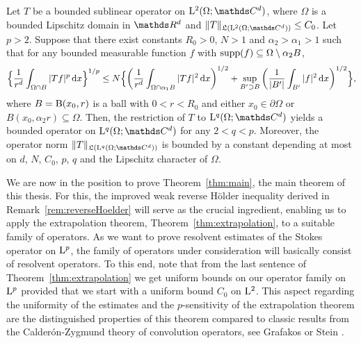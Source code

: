 \begin{thm}
  \label{thm:extrapolation}
  Let $T$ be a bounded sublinear operator on $\Ell^2(\Omega; \C^d)$, where $\Omega$ is a bounded Lipschitz domain in $\R^d$ and $\|T\|_{\Li(\Ell^2(\Omega; \C^d))} \leq C_0$.
  Let $p > 2$.
  Suppose that there exist constants $R_0 > 0$, $N > 1$ and $\alpha_2 > \alpha_1 > 1$ such that for any bounded measurable function $f$ with $\operatorname{supp}(f) \subseteq \Omega \setminus \alpha_2 B$,
  \begin{align*}
    \Big\{ \frac{1}{r^d} \int_{\Omega \cap B} |Tf|^p \, {\operatorname{d}\!{x}} \Big\}^{1/p}
    \leq N \Big\{ \bigg( \frac{1}{r^d} \int_{\Omega \cap \alpha_1 B} |T f|^2 \, {\operatorname{d}\!{x}} \bigg)^{1/2} + \sup_{B' \supset B} \bigg( \frac{1}{|B'|} \int_{B'} |f|^2 \, {\operatorname{d}\!{x}} \bigg)^{1/2} \Big\},
  \end{align*}
  where $B = \mathrm{B}(x_0, r)$ is a ball with $0 < r < R_0$ and either $x_0 \in \partial\Omega$ or $B(x_0, \alpha_2 r) \subseteq \Omega$.
  Then, the restriction of $T$ to $\Ell^q(\Omega;\C^d)$ yields a bounded operator on $\Ell^q(\Omega; \C^d)$ for any $2 < q < p$.
  Moreover, the operator norm $\|T\|_{\Li(\Ell^q(\Omega; \C^d))}$ is bounded by a constant depending at most on $d$, $N$, $C_0$, $p$, $q$ and the Lipschitz character of $\Omega$.
\end{thm}

We are now in the position to prove Theorem~\ref{thm:main}, the main theorem of this thesis. 
For this, the improved weak reverse H\"older inequality derived in Remark~\ref{rem:reverseHoelder} will serve as the crucial ingredient, enabling us to apply the extrapolation theorem, Theorem~\ref{thm:extrapolation}, to a suitable family of operators.
As we want to prove resolvent estimates of the Stokes operator on $\mathrm{L}^p$, the family of operators under consideration will basically consist of resolvent operators.
To this end, note that from the last sentence of Theorem~\ref{thm:extrapolation} we get uniform bounds on our operator family on $\mathrm{L}^p$ provided that we start with a uniform bound $C_0$ on $\mathrm{L}^2$.
This aspect regarding the uniformity of the estimates and the $p$-sensitivity of the extrapolation theorem are the distinguished properties of this theorem compared to classic results from the Calder\'on-Zygmund theory of convolution operators, see Grafakos \cite[Sec.\@~5.3]{grafakos2014classical} or Stein \cite[Ch.\@~2]{stein}.

